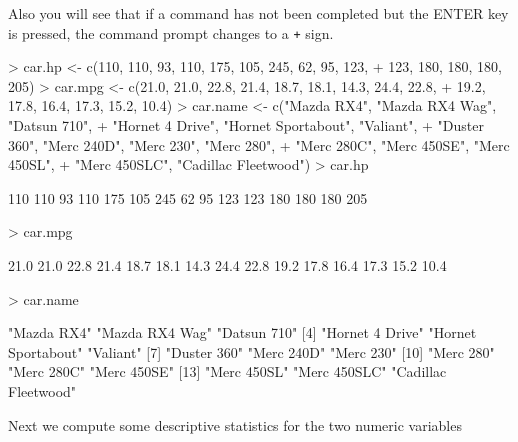 Also you will see that if a command has not been completed but the ENTER key is pressed, the command prompt changes to a \verb-+- sign.
\begin{Schunk}
\begin{Sinput}
> car.hp <- c(110, 110, 93, 110, 175, 105, 245, 62, 95, 123, 
+ 123, 180, 180, 180, 205)
> car.mpg <- c(21.0, 21.0, 22.8, 21.4, 18.7, 18.1, 14.3, 24.4, 22.8, 
+              19.2, 17.8, 16.4, 17.3, 15.2, 10.4)
> car.name <- c("Mazda RX4", "Mazda RX4 Wag", "Datsun 710", 
+               "Hornet 4 Drive", "Hornet Sportabout", "Valiant", 
+               "Duster 360", "Merc 240D", "Merc 230", "Merc 280", 
+               "Merc 280C", "Merc 450SE", "Merc 450SL", 
+               "Merc 450SLC", "Cadillac Fleetwood")
> car.hp
\end{Sinput}
\begin{Soutput}
 [1] 110 110  93 110 175 105 245  62  95 123 123 180 180 180 205
\end{Soutput}
\begin{Sinput}
> car.mpg
\end{Sinput}
\begin{Soutput}
 [1] 21.0 21.0 22.8 21.4 18.7 18.1 14.3 24.4 22.8 19.2 17.8 16.4 17.3 15.2 10.4
\end{Soutput}
\begin{Sinput}
> car.name
\end{Sinput}
\begin{Soutput}
 [1] "Mazda RX4"          "Mazda RX4 Wag"      "Datsun 710"        
 [4] "Hornet 4 Drive"     "Hornet Sportabout"  "Valiant"           
 [7] "Duster 360"         "Merc 240D"          "Merc 230"          
[10] "Merc 280"           "Merc 280C"          "Merc 450SE"        
[13] "Merc 450SL"         "Merc 450SLC"        "Cadillac Fleetwood"
\end{Soutput}
\end{Schunk}
Next we compute some descriptive statistics for the two numeric variables

